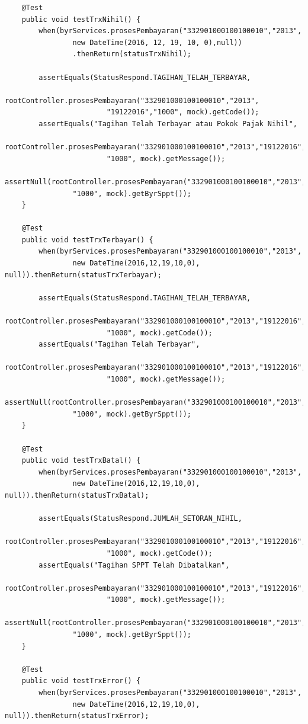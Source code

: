 \documentclass[pdftex,12pt, oneside]{article}
\begin{document}
\begin{enumerate}[A.]
\begin{enumerate}[1.]
\begin{lstlisting}
    @Test
    public void testTrxNihil() {
        when(byrServices.prosesPembayaran("332901000100100010","2013",
                new DateTime(2016, 12, 19, 10, 0),null))
                .thenReturn(statusTrxNihil);

        assertEquals(StatusRespond.TAGIHAN_TELAH_TERBAYAR,
                rootController.prosesPembayaran("332901000100100010","2013",
                        "19122016","1000", mock).getCode());
        assertEquals("Tagihan Telah Terbayar atau Pokok Pajak Nihil",
                rootController.prosesPembayaran("332901000100100010","2013","19122016",
                        "1000", mock).getMessage());
        assertNull(rootController.prosesPembayaran("332901000100100010","2013","19122016",
                "1000", mock).getByrSppt());
    }

    @Test
    public void testTrxTerbayar() {
        when(byrServices.prosesPembayaran("332901000100100010","2013",
                new DateTime(2016,12,19,10,0), null)).thenReturn(statusTrxTerbayar);

        assertEquals(StatusRespond.TAGIHAN_TELAH_TERBAYAR,
                rootController.prosesPembayaran("332901000100100010","2013","19122016",
                        "1000", mock).getCode());
        assertEquals("Tagihan Telah Terbayar",
                rootController.prosesPembayaran("332901000100100010","2013","19122016",
                        "1000", mock).getMessage());
        assertNull(rootController.prosesPembayaran("332901000100100010","2013","19122016",
                "1000", mock).getByrSppt());
    }

    @Test
    public void testTrxBatal() {
        when(byrServices.prosesPembayaran("332901000100100010","2013",
                new DateTime(2016,12,19,10,0), null)).thenReturn(statusTrxBatal);

        assertEquals(StatusRespond.JUMLAH_SETORAN_NIHIL,
                rootController.prosesPembayaran("332901000100100010","2013","19122016",
                        "1000", mock).getCode());
        assertEquals("Tagihan SPPT Telah Dibatalkan",
                rootController.prosesPembayaran("332901000100100010","2013","19122016",
                        "1000", mock).getMessage());
        assertNull(rootController.prosesPembayaran("332901000100100010","2013","19122016",
                "1000", mock).getByrSppt());
    }

    @Test
    public void testTrxError() {
        when(byrServices.prosesPembayaran("332901000100100010","2013",
                new DateTime(2016,12,19,10,0), null)).thenReturn(statusTrxError);


\end{lstlisting}
\end{enumerate}
\end{enumerate}
\end{document}
